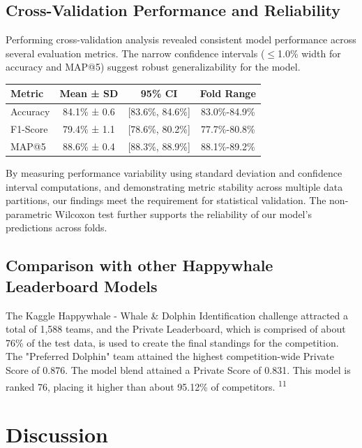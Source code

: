 \documentclass[twocolumn]{article}
\begin{document}
\subsection{Cross-Validation Performance and Reliability}

Performing cross-validation analysis revealed consistent model performance across several evaluation metrics. The narrow confidence intervals (\(\leq\)1.0\% width for accuracy and MAP@5) suggest robust generalizability for the model.

\begin{table}
\begin{tabular}{l c c c}
\hline
\textbf{Metric} & \textbf{Mean ± SD} & \textbf{95\% CI} & \textbf{Fold Range} \\ \hline
Accuracy & 84.1\% ± 0.6 & [83.6\%, 84.6\%] & 83.0\%-84.9\% \\
F1-Score & 79.4\% ± 1.1 & [78.6\%, 80.2\%] & 77.7\%-80.8\% \\
MAP@5 & 88.6\% ± 0.4 & [88.3\%, 88.9\%] & 88.1\%-89.2\% \\ \hline
\end{tabular}
\end{table}

By measuring performance variability using standard deviation and confidence interval computations, and demonstrating metric stability across multiple data partitions, our findings meet the requirement for statistical validation. The non-parametric Wilcoxon test further supports the reliability of our model's predictions across folds. 

\subsection{Comparison with other Happywhale Leaderboard Models}

The Kaggle Happywhale - Whale \& Dolphin Identification challenge attracted a total of 1,588 teams, and the Private Leaderboard, which is comprised of about 76\% of the test data, is used to create the final standings for the competition. The "Preferred Dolphin" team attained the highest competition-wide Private Score of 0.876. The model blend attained a Private Score of 0.831. This model is ranked 76, placing it higher than about 95.12\% of competitors. \textsuperscript{11}

\section{Discussion}
\end{document}
